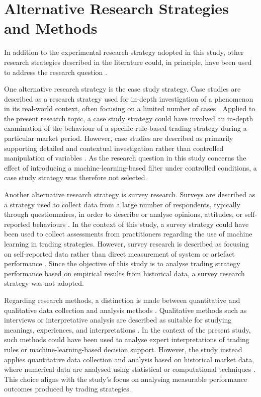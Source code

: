 \section{Alternative Research Strategies and Methods}

In addition to the experimental research strategy adopted in this study, other research strategies described in the literature could, in principle, have been used to address the research question \citep{johannesson2014design}.

One alternative research strategy is the case study strategy. Case studies are described as a research strategy used for in-depth investigation of a phenomenon in its real-world context, often focusing on a limited number of cases \citep{johannesson2014design}. Applied to the present research topic, a case study strategy could have involved an in-depth examination of the behaviour of a specific rule-based trading strategy during a particular market period. However, case studies are described as primarily supporting detailed and contextual investigation rather than controlled manipulation of variables \citep{johannesson2014design}. As the research question in this study concerns the effect of introducing a machine-learning-based filter under controlled conditions, a case study strategy was therefore not selected.

Another alternative research strategy is survey research. Surveys are described as a strategy used to collect data from a large number of respondents, typically through questionnaires, in order to describe or analyse opinions, attitudes, or self-reported behaviours \citep{johannesson2014design}. In the context of this study, a survey strategy could have been used to collect assessments from practitioners regarding the use of machine learning in trading strategies. However, survey research is described as focusing on self-reported data rather than direct measurement of system or artefact performance \citep{johannesson2014design}. Since the objective of this study is to analyse trading strategy performance based on empirical results from historical data, a survey research strategy was not adopted.

Regarding research methods, a distinction is made between quantitative and qualitative data collection and analysis methods \citep{johannesson2014design}. Qualitative methods such as interviews or interpretative analysis are described as suitable for studying meanings, experiences, and interpretations \citep{johannesson2014design}. In the context of the present study, such methods could have been used to analyse expert interpretations of trading rules or machine-learning-based decision support. However, the study instead applies quantitative data collection and analysis based on historical market data, where numerical data are analysed using statistical or computational techniques \citep{johannesson2014design}. This choice aligns with the study’s focus on analysing measurable performance outcomes produced by trading strategies.


